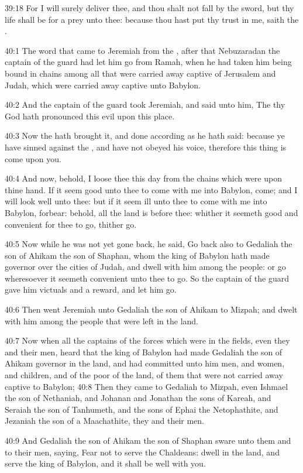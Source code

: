 39:18 For I will surely deliver thee, and thou shalt not fall by the
sword, but thy life shall be for a prey unto thee: because thou hast
put thy trust in me, saith the \LORD.

40:1 The word that came to Jeremiah from the \LORD, after that
Nebuzaradan the captain of the guard had let him go from Ramah, when
he had taken him being bound in chains among all that were carried
away captive of Jerusalem and Judah, which were carried away captive
unto Babylon.

40:2 And the captain of the guard took Jeremiah, and said unto him,
The \LORD thy God hath pronounced this evil upon this place.

40:3 Now the \LORD hath brought it, and done according as he hath said:
because ye have sinned against the \LORD, and have not obeyed his
voice, therefore this thing is come upon you.

40:4 And now, behold, I loose thee this day from the chains which were
upon thine hand. If it seem good unto thee to come with me into
Babylon, come; and I will look well unto thee: but if it seem ill unto
thee to come with me into Babylon, forbear: behold, all the land is
before thee: whither it seemeth good and convenient for thee to go,
thither go.

40:5 Now while he was not yet gone back, he said, Go back also to
Gedaliah the son of Ahikam the son of Shaphan, whom the king of
Babylon hath made governor over the cities of Judah, and dwell with
him among the people: or go wheresoever it seemeth convenient unto
thee to go. So the captain of the guard gave him victuals and a
reward, and let him go.

40:6 Then went Jeremiah unto Gedaliah the son of Ahikam to Mizpah; and
dwelt with him among the people that were left in the land.

40:7 Now when all the captains of the forces which were in the fields,
even they and their men, heard that the king of Babylon had made
Gedaliah the son of Ahikam governor in the land, and had committed
unto him men, and women, and children, and of the poor of the land, of
them that were not carried away captive to Babylon; 40:8 Then they
came to Gedaliah to Mizpah, even Ishmael the son of Nethaniah, and
Johanan and Jonathan the sons of Kareah, and Seraiah the son of
Tanhumeth, and the sons of Ephai the Netophathite, and Jezaniah the
son of a Maachathite, they and their men.

40:9 And Gedaliah the son of Ahikam the son of Shaphan sware unto them
and to their men, saying, Fear not to serve the Chaldeans: dwell in
the land, and serve the king of Babylon, and it shall be well with
you.

